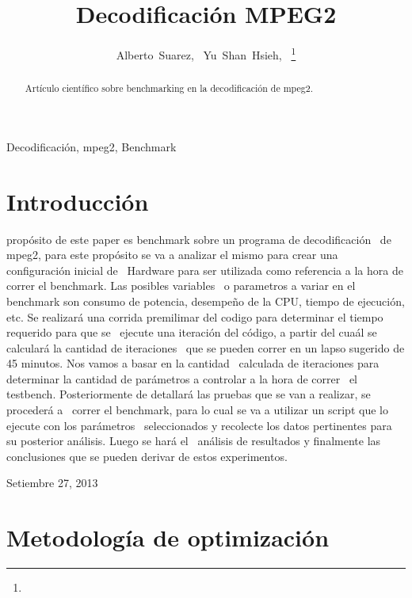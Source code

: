 \documentclass[journal]{IEEEtran}
\begin{document}
%
\title{Decodificaci\'{o}n MPEG2}
\author{Alberto~Suarez,~
        Yu~Shan~Hsieh,~%
\thanks{}%
}
\maketitle

\begin{abstract}
Art\'{i}culo cient\'{i}fico sobre benchmarking en la decodificaci\'{o}n de mpeg2.
\end{abstract}

\begin{IEEEkeywords}
Decodificaci\'{o}n, mpeg2, Benchmark
\end{IEEEkeywords}

\section{Introducci\'{o}n}
 prop\'{o}sito de este paper es benchmark sobre un programa de decodificaci\'{o}n \
de mpeg2, para este prop\'osito se va a analizar el mismo para crear una configuraci\'on inicial de \
Hardware para ser utilizada como referencia a la hora de correr el benchmark. Las posibles variables \
o parametros a variar en el benchmark son consumo de potencia, desempe\~{n}o de la CPU, tiempo de ejecuci\'{o}n, etc. 
Se realizar\'a una corrida premilimar del codigo para determinar el tiempo requerido para que se \
ejecute una iteraci\'on del c\'odigo, a partir del cua\'al se calcular\'a la cantidad de iteraciones \
que se pueden correr en un lapso sugerido de 45 minutos. \newline  Nos vamos a basar en la cantidad \
calculada de iteraciones para determinar la cantidad de par\'ametros a controlar a la hora de correr \
el testbench. Posteriormente de detallar\'{a} las pruebas que se van a realizar, se proceder\'a a \
correr el benchmark, para lo cual se va a utilizar un script que lo ejecute con los par\'ametros \
seleccionados y recolecte los datos pertinentes para su posterior an\'alisis. Luego se har\'{a} el \
an\'{a}lisis de resultados y finalmente las conclusiones que se pueden derivar de estos experimentos.


\hfill Setiembre 27, 2013

\section{Metodolog\'{i}a de optimizaci\'{o}n}
\end{document}
